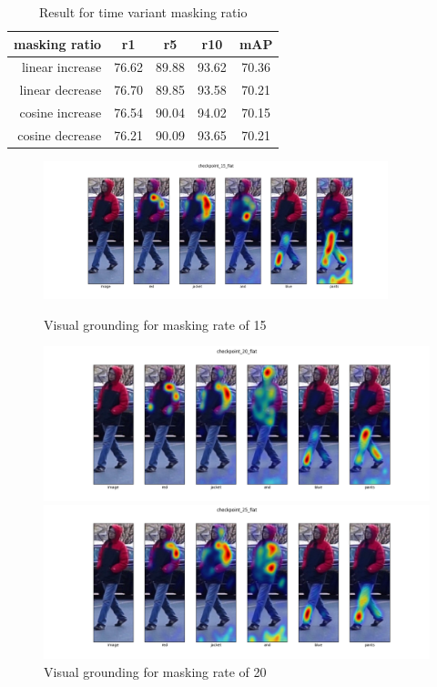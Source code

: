 \begin{table}[htbp]
  \caption{Result for time variant masking ratio}
  \begin{tabular}{rcccc}
    \centering
    masking ratio & r1 & r5 & r10 & mAP\\ \hline
    linear increase & 76.62 & 89.88 & 93.62 & 70.36 \\
    linear decrease & 76.70 & 89.85 & 93.58 & 70.21 \\
    cosine increase & 76.54 & 90.04 & 94.02 & 70.15 \\
    cosine decrease & 76.21 & 90.09 & 93.65 & 70.21 \\
  \end{tabular}
\end{table}

\begin{figure}
  \includegraphics[width=10cm]{img/mrtd_masking_ratio/mrtd-checkpoint_15_flat.png}
  \caption{Visual grounding for masking rate of 15}
  \includegraphics[width=\linewidth]{img/mrtd_masking_ratio/mrtd-checkpoint_20_flat.png}
  \caption{Visual grounding for masking rate of 20}
  \includegraphics[width=\linewidth]{img/mrtd_masking_ratio/mrtd-checkpoint_25_flat.png}

\end{figure}
